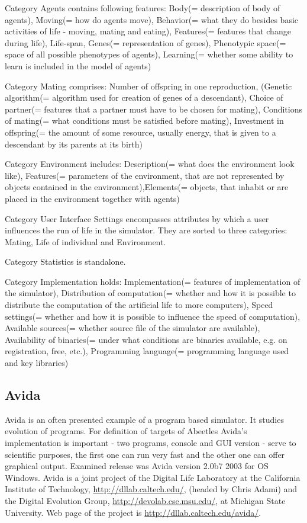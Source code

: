 \documentclass[a4paper,12pt]{report}
\begin{document}
Category Agents contains following features: Body(= description of body of agents), Moving(= how do agents move), Behavior(= what they do besides basic activities of life - moving, mating and eating), Features(= features that change during life), Life-span, Genes(= representation of genes), Phenotypic space(= space of all possible phenotypes of agents), Learning(= whether some ability to learn is included in the model of agents)

Category Mating comprises: Number of offspring in one reproduction, (Genetic algorithm(= algorithm used for creation of genes of a descendant), Choice of partner(= features that a partner must have to be chosen for mating), Conditions of mating(= what conditions must be satisfied before mating), Investment in offspring(= the amount of some resource, usually energy, that is given to a descendant by its parents at its birth)

Category Environment includes: Description(= what does the environment look like), Features(= parameters of the environment, that are not represented by objects contained in the environment),Elements(= objects, that inhabit or are placed in the environment together with agents)

Category User Interface Settings  encompasses attributes by which a user  influences the run of life in the simulator. They are sorted to three categories: Mating, Life of individual and Environment.

Category Statistics is standalone.

Category Implementation holds: Implementation(= features of implementation of the simulator), Distribution of computation(= whether and how it is possible to distribute the computation of the artificial life to more computers), Speed settings(= whether and how it is possible to influence the speed of computation), Available sources(= whether source file of the simulator are available), Availability of binaries(= under what conditions are binaries available, e.g. on registration, free, etc.), Programming language(= programming language used and key libraries)

 
\subsection {Avida}

Avida is an often presented example of a program based simulator. It studies evolution of programs. For definition of targets of Abeetles Avida's implementation is important  - two programs, console and GUI version - serve to scientific purposes, the first one can run very fast and the other one can offer graphical output. Examined release was Avida version 2.0b7 2003 for OS Windows. Avida is a joint project of the Digital Life Laboratory at the California Institute of Technology, \url{http://dllab.caltech.edu/}, (headed by Chris Adami) and the Digital Evolution Group, \url{http://devolab.cse.msu.edu/}, at Michigan State University. Web page of the project is \url{http://dllab.caltech.edu/avida/}.
\end{document}
